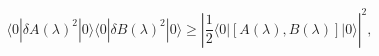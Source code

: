 \begin{equation}
\langle 0|  \delta A(\lambda)^2|0 \rangle 
\langle 0| \delta B(\lambda)^2|0 \rangle
\geq \left|\frac{1}{2}\langle 0|  [A(\lambda), B(\lambda)] |0 \rangle \right|^2,
\label{inequ}
\end{equation}

